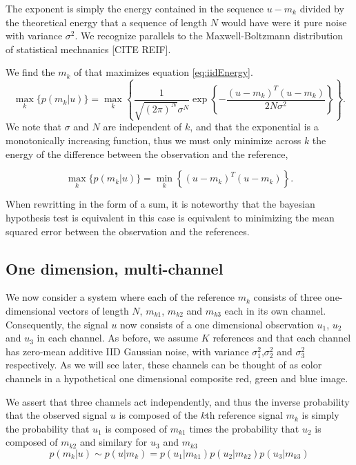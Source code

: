 The exponent is simply the energy contained in the sequence $u-m_k$ divided by the
theoretical energy that a sequence of length $N$ would have were it pure noise with variance $\sigma^2$. We recognize parallels to the Maxwell-Boltzmann distribution of statistical
mechnanics [CITE REIF].  

We find the $m_k$ of that maximizes equation \ref{eq:iidEnergy}.
\begin{equation}
\max_k   \big\{ p(m_k|u) \big\} =  \max_k  \left\{ \frac{1}{  \sqrt{ (2\pi)^N} \sigma^N  } \exp\left\{ -\frac{(u-m_k)^T(u-m_k)} {2 N \sigma^2 } \right\} \right\}. 
\end{equation}
We note that $\sigma$ and $N$ are independent of $k$, and that the exponential is a monotonically increasing function, thus we must only minimize across $k$ the energy of the difference between the observation and the reference,

\begin{equation}
\max_k   \big\{ p(m_k|u) \big\} =  \min_k  \left\{ (u-m_k)^T(u-m_k) \right\}. 
\end{equation}

When rewritting in the form of a sum,
it is noteworthy that the bayesian hypothesis test is equivalent in this case is equivalent to minimizing the mean squared error between the observation and the references.


\subsection{One dimension, multi-channel}
We now consider a system where each of the reference $m_k$ consists of three one-dimensional vectors of length $N$, $m_{k1}$, $m_{k2}$ and $m_{k3}$ each in its own channel. Consequently, the signal $u$ now consists of a one dimensional observation $u_1$, $u_2$ and $u_3$ in each channel. As before, we assume $K$ references and that each channel has zero-mean additive IID Gaussian noise, with variance $\sigma_1^2$,$\sigma_2^2$ and $\sigma_3^2$ respectively. As we will see later, these channels can be thought of as color channels in a hypothetical one dimensional composite red, green and blue image. 

We assert that three channels act independently, and thus the inverse probability that the observed signal $u$ is composed of the $k$th reference signal $m_k$ is simply the probability that $u_1$ is composed of $m_{k1}$ times the probability that $u_2$ is composed of $m_{k2}$ and similary for $u_3$ and $m_{k3}$
\begin{equation}
p(m_k|u)\sim p(u|m_k) = p(u_1|m_{k1})p(u_2|m_{k2})p(u_3|m_{k3})
\end{equation}


